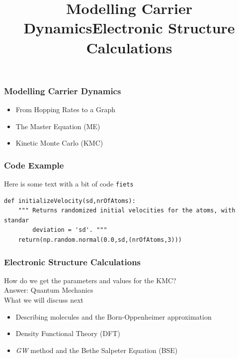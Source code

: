 \documentclass[t,aspectratio=169, 8pt]{beamer}
\begin{document}
\title{Modelling Carrier Dynamics}
\begin{chapterframe}
	\frametitle{Modelling Carrier Dynamics}
	\begin{itemize}
		\item From Hopping Rates to a Graph
		\item The Master Equation (ME)
		\item Kinetic Monte Carlo (KMC)
	\end{itemize}
\end{chapterframe}

\begin{frame}[fragile]
	\frametitle{Code Example}
	Here is some text with a bit of code \texttt{fiets}
	\begin{verbatim}
def initializeVelocity(sd,nrOfAtoms):
    """ Returns randomized initial velocities for the atoms, with standar
        deviation = 'sd'. """
    return(np.random.normal(0.0,sd,(nrOfAtoms,3)))
	\end{verbatim}
\end{frame}

\title{Electronic Structure Calculations}
\begin{chapterframe}
	\frametitle{Electronic Structure Calculations}
	How do we get the parameters and values for the KMC?\\
	Answer: Quantum Mechanics\\
	\medskip
	What we will discuss next
	\begin{itemize}
		\item Describing molecules and the Born-Oppenheimer approximation
		\item Density Functional Theory (DFT)
		\item \textit{GW} method and the Bethe Salpeter Equation (BSE)
	\end{itemize}
\end{chapterframe}
\end{document}
